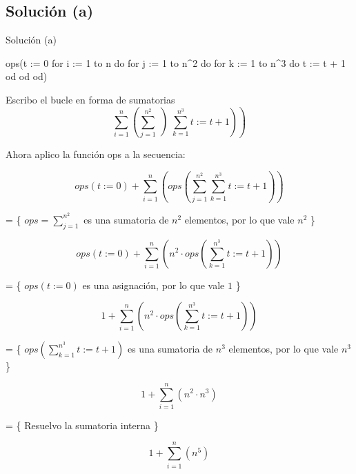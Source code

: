 \subsection{Solución (a)}

\begin{codebox}{Solución (a)}
\begin{pascallike}
ops(t := 0
for i := 1 to n do
    for j := 1 to n^2 do
    for k := 1 to n^3 do
        t := t + 1
    od
    od
od)
\end{pascallike}
\end{codebox}

Escribo el bucle en forma de sumatorias 
\begin{equation*}
  \sum_{i=1}^{n} \left(  \sum_{j=1}^{n^2} \left) \sum_{k=1}^{n^3} t := t+1 \right) \right)
\end{equation*}

Ahora aplico la función ops a la secuencia:

\begin{equation*}
  ops(t := 0) + \sum_{i=1}^{n} \left(  ops\left(\sum_{j=1}^{n^2} \sum_{k=1}^{n^3} t := t+1 \right) \right)
\end{equation*}

= \{ $ops=\sum_{j=1}^{n^2}$ es una sumatoria de $n^2$ elementos, por lo que vale $n^2$ \}

\begin{equation*}
  ops(t := 0) + \sum_{i=1}^{n} \left(  n^2 \cdot ops \left(\sum_{k=1}^{n^3} t := t+1 \right) \right)
\end{equation*}

= \{ $ops(t := 0)$ es una asignación, por lo que vale $1$ \}

\begin{equation*}
  1 + \sum_{i=1}^{n} \left(  n^2 \cdot ops \left(\sum_{k=1}^{n^3} t := t+1 \right) \right)
\end{equation*}

= \{ $ops \left(\sum_{k=1}^{n^3} t := t+1 \right)$ es una sumatoria de $n^3$ elementos, por lo que vale $n^3$ \}

\begin{equation*}
  1 + \sum_{i=1}^{n} \left(  n^2 \cdot n^3 \right)
\end{equation*}

= \{ Resuelvo la sumatoria interna \}

\begin{equation*}
  1 + \sum_{i=1}^{n} \left(  n^5 \right)
\end{equation*}

